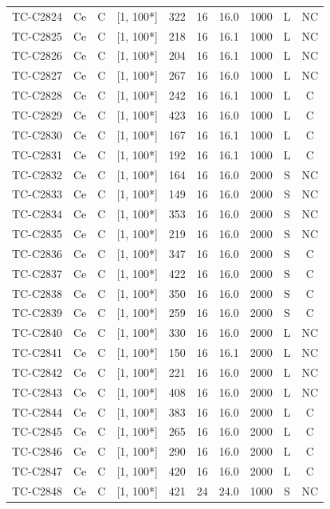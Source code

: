 \begin{longtable}{lccccccccc}
TC-C2824 & Ce & C & [1, 100*] & 322 & 16 & 16.0 & 1000 & L & NC \\
TC-C2825 & Ce & C & [1, 100*] & 218 & 16 & 16.1 & 1000 & L & NC \\
TC-C2826 & Ce & C & [1, 100*] & 204 & 16 & 16.1 & 1000 & L & NC \\
TC-C2827 & Ce & C & [1, 100*] & 267 & 16 & 16.0 & 1000 & L & NC \\
TC-C2828 & Ce & C & [1, 100*] & 242 & 16 & 16.1 & 1000 & L & C \\
TC-C2829 & Ce & C & [1, 100*] & 423 & 16 & 16.0 & 1000 & L & C \\
TC-C2830 & Ce & C & [1, 100*] & 167 & 16 & 16.1 & 1000 & L & C \\
TC-C2831 & Ce & C & [1, 100*] & 192 & 16 & 16.1 & 1000 & L & C \\
TC-C2832 & Ce & C & [1, 100*] & 164 & 16 & 16.0 & 2000 & S & NC \\
TC-C2833 & Ce & C & [1, 100*] & 149 & 16 & 16.0 & 2000 & S & NC \\
TC-C2834 & Ce & C & [1, 100*] & 353 & 16 & 16.0 & 2000 & S & NC \\
TC-C2835 & Ce & C & [1, 100*] & 219 & 16 & 16.0 & 2000 & S & NC \\
TC-C2836 & Ce & C & [1, 100*] & 347 & 16 & 16.0 & 2000 & S & C \\
TC-C2837 & Ce & C & [1, 100*] & 422 & 16 & 16.0 & 2000 & S & C \\
TC-C2838 & Ce & C & [1, 100*] & 350 & 16 & 16.0 & 2000 & S & C \\
TC-C2839 & Ce & C & [1, 100*] & 259 & 16 & 16.0 & 2000 & S & C \\
TC-C2840 & Ce & C & [1, 100*] & 330 & 16 & 16.0 & 2000 & L & NC \\
TC-C2841 & Ce & C & [1, 100*] & 150 & 16 & 16.1 & 2000 & L & NC \\
TC-C2842 & Ce & C & [1, 100*] & 221 & 16 & 16.0 & 2000 & L & NC \\
TC-C2843 & Ce & C & [1, 100*] & 408 & 16 & 16.0 & 2000 & L & NC \\
TC-C2844 & Ce & C & [1, 100*] & 383 & 16 & 16.0 & 2000 & L & C \\
TC-C2845 & Ce & C & [1, 100*] & 265 & 16 & 16.0 & 2000 & L & C \\
TC-C2846 & Ce & C & [1, 100*] & 290 & 16 & 16.0 & 2000 & L & C \\
TC-C2847 & Ce & C & [1, 100*] & 420 & 16 & 16.0 & 2000 & L & C \\
TC-C2848 & Ce & C & [1, 100*] & 421 & 24 & 24.0 & 1000 & S & NC \\

\end{longtable}
